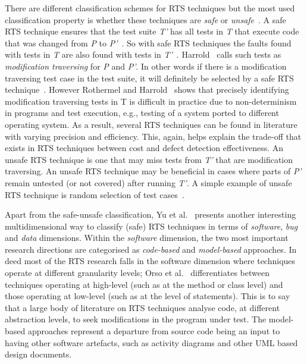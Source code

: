 \documentclass[11pt, oneside]{article}   	%
\begin{document}
There are different classification schemes for RTS techniques but the most used classification property is whether these techniques are \textit{safe} or \textit{unsafe}~\cite{Emelie10}. A safe RTS technique ensures that the test suite \textit{T'} has all tests in \textit{T} that execute code that was changed from \textit{P} to \textit{P'}~\cite{Harrold99}. So with safe RTS techniques the faults found with tests in \textit{T} are also found with tests in \textit{T'}~\cite{Emelie10}. Harrold~\cite{Harrold99} calls such tests as \textit{modification traversing} for \textit{P} and \textit{P'}.  In other words if there is a modification traversing test case in the test suite, it will definitely be selected by a safe RTS technique~\cite{Yoo12}. However Rothermel and Harrold~\cite{Rothermel96} shows that precisely identifying modification traversing tests in T is difficult in practice due to non-determinism in programs and test execution, e.g., testing of a system ported to different operating system. As a result, several RTS techniques can be found in literature with varying precision and efficiency. This, again, helps explain the trade-off that exists in RTS techniques between cost and defect detection effectiveness. An unsafe RTS technique is one that may miss tests from \textit{T'} that are modification traversing. An unsafe RTS technique may be beneficial in cases where parts of \textit{P'} remain untested (or not covered) after running \textit{T'}. A simple example of unsafe RTS technique is random selection of test cases~\cite{Emelie10}. 

Apart from the safe-unsafe classification, Yu et al.~\cite{Yu12} presents another interesting multidimensional way to classify (safe) RTS techniques in terms of \textit{software}, \textit{bug} and \textit{data} dimensions. Within the \textit{software} dimension, the two most important research directions are categorised as \textit{code-based} and \textit{model-based} approaches. In deed most of the RTS research falls in the software dimension where techniques operate at different granularity levels; Orso et al.~\cite{Orso04} differentiates between techniques operating at high-level (such as at the method or class level) and those operating at low-level (such as at the level of statements). This is to say that a large body of literature on RTS techniques analyse code, at different abstraction levels, to seek modifications in the program under test. The model-based approaches represent a departure from source code being an input to having other software artefacts, such as activity diagrams and other UML based design documents.



\end{document}
